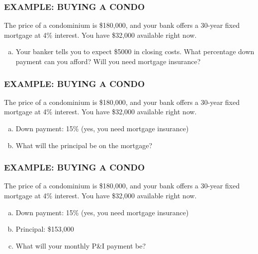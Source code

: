 \documentclass[8pt]{beamer}
\newcommand{\extitle}[1]{\frametitle{\fontfamily{fvs}\selectfont \small\color{black!70!blue!80!cyan}\uppercase{\bfseries Example: #1}}}
\def\solblank{\begin{tcolorbox}[colframe=black!50!blue!50!cyan,
colback=white,
bottomrule=0mm,
rightrule=0mm,
sharp corners=all] 
\vspace{6in}
\text{}
\end{tcolorbox}}
\begin{document}
\begin{frame}
\extitle{Buying a Condo}
The price of a condominium is \$180,000, and your bank offers a 30-year fixed mortgage at 4\% interest.  You have \$32,000 available right now.
\begin{enumerate}[(a)]
\item Your banker tells you to expect \$5000 in closing costs.  What percentage down payment can you afford?  Will you need mortgage insurance?
\end{enumerate}

\solblank
\end{frame}

\begin{frame}
\extitle{Buying a Condo}
The price of a condominium is \$180,000, and your bank offers a 30-year fixed mortgage at 4\% interest.  You have \$32,000 available right now.
\begin{enumerate}[(a)]
\item Down payment: 15\% (yes, you need mortgage insurance)
\item What will the principal be on the mortgage?
\end{enumerate}

\solblank
\end{frame}

\begin{frame}
\extitle{Buying a Condo}
The price of a condominium is \$180,000, and your bank offers a 30-year fixed mortgage at 4\% interest.  You have \$32,000 available right now.
\begin{enumerate}[(a)]
\item Down payment: 15\% (yes, you need mortgage insurance)
\item Principal: \$153,000
\item What will your monthly P\&I payment be?
\end{enumerate}

\solblank
\end{frame}
\end{document}
